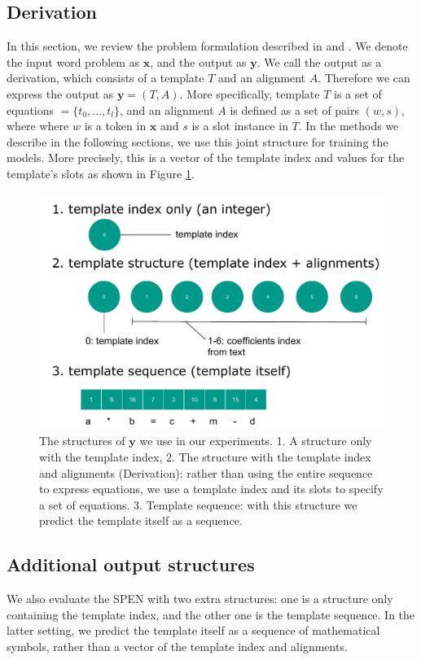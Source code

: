 \documentclass[11pt,letterpaper]{article}
\begin{document}
\subsection{Derivation}
In this section, we review the problem formulation described in \cite{Kushman2014LearningTA} and \cite{UpChChYi16}. We denote the input word problem as $\textbf{x}$, and the output as $\textbf{y}$. We call the output as a derivation, which consists of a template $T$ and an alignment $A$. Therefore we can express the output as $\textbf{y} = (T, A)$. More specifically, template $T$ is a set of equations $= \{t_0, ..., t_l\}$, and an alignment $A$ is defined as a set of pairs $(w, s)$, where where $w$ is a token in $\textbf{x}$ and $s$ is a slot instance in $T$. In the methods we describe in the following sections, we use this joint structure for training the models. More precisely, this is a vector of the template index and values for the template's slots as shown in Figure \ref{derivation}.
\begin{figure}[ht]
	\centering
	\includegraphics[bb=0 0 502 344, scale=0.5]{figs/structures.pdf}
    \caption{The structures of $\mathbf{y}$ we use in our experiments. 1. A structure only with the template index, 2. The structure with the template index and alignments (Derivation): rather than using the entire sequence to express equations, we use a template index and its slots to specify a set of equations. 3. Template sequence: with this structure we predict the template itself as a sequence.}
    \label{derivation}
\end{figure}
\subsection{Additional output structures}
We also evaluate the SPEN with two extra structures: one is a structure only containing the template index, and the other one is the template sequence. In the latter setting, we predict the template itself as a sequence of mathematical symbols, rather than a vector of the template index and alignments.
\end{document}
